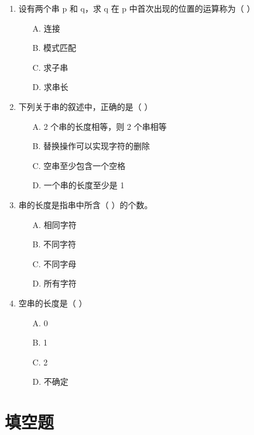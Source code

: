 \documentclass[12pt, a4paper]{article}
\begin{document}
\begin{enumerate}[label=\arabic*.]
	\item 设有两个串 p 和 q，求 q 在 p 中首次出现的位置的运算称为（ ）
	      \begin{enumerate}
		      \item[A.] 连接
		      \item[B.] 模式匹配
		      \item[C.] 求子串
		      \item[D.] 求串长
	      \end{enumerate}

	\item 下列关于串的叙述中，正确的是（ ）
	      \begin{enumerate}
		      \item[A.] 2 个串的长度相等，则 2 个串相等
		      \item[B.] 替换操作可以实现字符的删除
		      \item[C.] 空串至少包含一个空格
		      \item[D.] 一个串的长度至少是 1
	      \end{enumerate}

	\item 串的长度是指串中所含（ ）的个数。
	      \begin{enumerate}
		      \item[A.] 相同字符
		      \item[B.] 不同字符
		      \item[C.] 不同字母
		      \item[D.] 所有字符
	      \end{enumerate}

	\item 空串的长度是（ ）
	      \begin{enumerate}
		      \item[A.] 0
		      \item[B.] 1
		      \item[C.] 2
		      \item[D.] 不确定
	      \end{enumerate}
\end{enumerate}

\section*{填空题}
\end{document}
